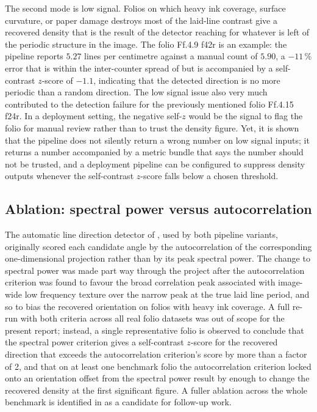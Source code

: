 The second mode is low signal. Folios on which heavy ink coverage,
surface curvature, or paper damage destroys most of the
laid-line contrast give a recovered density that is the result of
the detector reaching for whatever is left of the periodic
structure in the image. The folio Ff.4.9 f42r is an example: the
pipeline reports $5.27$ lines per centimetre against a manual
count of $5.90$, a $-11\,\%$ error that is within the
inter-counter spread of  but is
accompanied by a self-contrast $z$-score of $-1.1$, indicating
that the detected direction is no more periodic than a random
direction. The low signal issue also very much contributed to the 
detection failure for the previously mentioned folio Ff.4.15 f24r. 
In a deployment setting, the negative self-$z$ would
be the signal to flag the folio for manual review rather than to
trust the density figure. Yet, it is shown that the pipeline does
not silently return a wrong number on low signal inputs; it
returns a number accompanied by a metric bundle that says the
number should not be trusted, and a deployment pipeline can be
configured to suppress density outputs whenever the self-contrast
$z$-score falls below a chosen threshold.


\subsection{Ablation: spectral power versus autocorrelation}
\label{sec:benchmark:ablation}

The automatic line direction detector of
, used by both pipeline variants,
originally scored each candidate angle by the autocorrelation of
the corresponding one-dimensional projection rather than by its
peak spectral power. The change to spectral power was made
part way through the project after the autocorrelation criterion
was found to favour the broad correlation peak associated with
image-wide low frequency texture over the narrow peak at the true
laid line period, and so to bias the recovered orientation on
folios with heavy ink coverage. A full re-run with both criteria
across all real folio datasets was out of scope for the present
report; instead, a single representative folio is observed to conclude
 that the spectral power criterion gives
a self-contrast $z$-score for the recovered direction that
exceeds the autocorrelation criterion's score by more than a
factor of 2, and that on at least one benchmark folio the
autocorrelation criterion locked onto an orientation offset from
the spectral power result by enough to change the recovered
density at the first significant figure. A fuller ablation across
the whole benchmark is identified in 
as a candidate for follow-up work.
